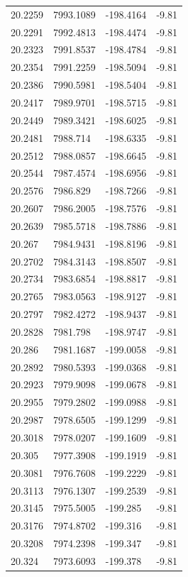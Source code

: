 \begin{table}[H]
\begin{tabular}{llll}
20.2259 & 7993.1089 & -198.4164 & -9.81 \\
20.2291 & 7992.4813 & -198.4474 & -9.81 \\
20.2323 & 7991.8537 & -198.4784 & -9.81 \\
20.2354 & 7991.2259 & -198.5094 & -9.81 \\
20.2386 & 7990.5981 & -198.5404 & -9.81 \\
20.2417 & 7989.9701 & -198.5715 & -9.81 \\
20.2449 & 7989.3421 & -198.6025 & -9.81 \\
20.2481 & 7988.714 & -198.6335 & -9.81 \\
20.2512 & 7988.0857 & -198.6645 & -9.81 \\
20.2544 & 7987.4574 & -198.6956 & -9.81 \\
20.2576 & 7986.829 & -198.7266 & -9.81 \\
20.2607 & 7986.2005 & -198.7576 & -9.81 \\
20.2639 & 7985.5718 & -198.7886 & -9.81 \\
20.267 & 7984.9431 & -198.8196 & -9.81 \\
20.2702 & 7984.3143 & -198.8507 & -9.81 \\
20.2734 & 7983.6854 & -198.8817 & -9.81 \\
20.2765 & 7983.0563 & -198.9127 & -9.81 \\
20.2797 & 7982.4272 & -198.9437 & -9.81 \\
20.2828 & 7981.798 & -198.9747 & -9.81 \\
20.286 & 7981.1687 & -199.0058 & -9.81 \\
20.2892 & 7980.5393 & -199.0368 & -9.81 \\
20.2923 & 7979.9098 & -199.0678 & -9.81 \\
20.2955 & 7979.2802 & -199.0988 & -9.81 \\
20.2987 & 7978.6505 & -199.1299 & -9.81 \\
20.3018 & 7978.0207 & -199.1609 & -9.81 \\
20.305 & 7977.3908 & -199.1919 & -9.81 \\
20.3081 & 7976.7608 & -199.2229 & -9.81 \\
20.3113 & 7976.1307 & -199.2539 & -9.81 \\
20.3145 & 7975.5005 & -199.285 & -9.81 \\
20.3176 & 7974.8702 & -199.316 & -9.81 \\
20.3208 & 7974.2398 & -199.347 & -9.81 \\
20.324 & 7973.6093 & -199.378 & -9.81 \\

\end{tabular}
\end{table}
